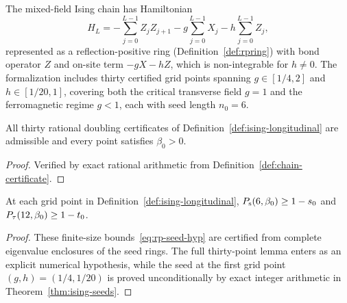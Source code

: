 \begin{definition}
  \label{def:ising-longitudinal}
  \leanok
  The mixed-field Ising chain has Hamiltonian
  \begin{equation}
    \label{eq:mixed-ising-ham}
    H_L = -\sum_{j=0}^{L-1} Z_j Z_{j+1} - g \sum_{j=0}^{L-1} X_j - h \sum_{j=0}^{L-1} Z_j,
  \end{equation}
  represented as a reflection-positive ring (Definition~\ref{def:rpring}) with bond operator \(Z\)
  and on-site term \(-gX - hZ\), which is non-integrable for \(h \ne 0\). The formalization
  includes thirty certified grid points spanning \(g \in [1/4, 2]\) and \(h \in [1/20, 1]\),
  covering both the critical transverse field \(g = 1\) and the ferromagnetic regime \(g < 1\),
  each with seed length \(n_0 = 6\).
\end{definition}

\begin{lemma}
  \label{lem:ising-longitudinal-valid}
  \leanok
  All thirty rational doubling certificates of Definition~\ref{def:ising-longitudinal} are
  admissible and every point satisfies \(\beta_0 > 0\).
\end{lemma}
\begin{proof}
  \leanok
  Verified by exact rational arithmetic from Definition~\ref{def:chain-certificate}.
\end{proof}

\begin{lemma}
  \label{lem:ising-longitudinal-seeds}
  \leanok
  At each grid point in Definition~\ref{def:ising-longitudinal}, \(P_{\mathrm{s}}(6, \beta_0) \ge 1 - s_0\) and
  \(P_{\tau}(12, \beta_0) \ge 1 - t_0\).
\end{lemma}
\begin{proof}
  These finite-size bounds~\eqref{eq:rp-seed-hyp} are certified from complete eigenvalue enclosures
  of the seed rings. The full thirty-point lemma enters as an explicit numerical hypothesis, while
  the seed at the first grid point \((g, h) = (1/4, 1/20)\) is proved unconditionally by exact
  integer arithmetic in Theorem~\ref{thm:ising-seeds}.
\end{proof}

